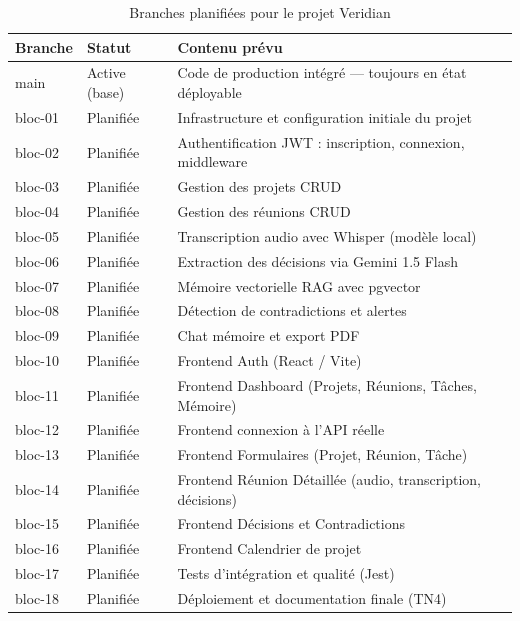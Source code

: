 \documentclass[12pt, a4paper]{article}
\begin{document}
\begin{table}[H]
  \centering
  \caption{Branches planifiées pour le projet Veridian}
  \begin{tabularx}{\textwidth}{>{\ttfamily}l l X}
    \toprule
    \textbf{Branche}  & \textbf{Statut}  & \textbf{Contenu prévu} \\
    \midrule
    main      & Active (base) & Code de production intégré — toujours en état déployable \\
    bloc-01   & Planifiée     & Infrastructure et configuration initiale du projet \\
    bloc-02   & Planifiée     & Authentification JWT : inscription, connexion, middleware \\
    bloc-03   & Planifiée     & Gestion des projets CRUD \\
    bloc-04   & Planifiée     & Gestion des réunions CRUD \\
    bloc-05   & Planifiée     & Transcription audio avec Whisper (modèle local) \\
    bloc-06   & Planifiée     & Extraction des décisions via Gemini 1.5 Flash \\
    bloc-07   & Planifiée     & Mémoire vectorielle RAG avec pgvector \\
    bloc-08   & Planifiée     & Détection de contradictions et alertes \\
    bloc-09   & Planifiée     & Chat mémoire et export PDF \\
    bloc-10   & Planifiée     & Frontend Auth (React / Vite) \\
    bloc-11   & Planifiée     & Frontend Dashboard (Projets, Réunions, Tâches, Mémoire) \\
    bloc-12   & Planifiée     & Frontend connexion à l'API réelle \\
    bloc-13   & Planifiée     & Frontend Formulaires (Projet, Réunion, Tâche) \\
    bloc-14   & Planifiée     & Frontend Réunion Détaillée (audio, transcription, décisions) \\
    bloc-15   & Planifiée     & Frontend Décisions et Contradictions \\
    bloc-16   & Planifiée     & Frontend Calendrier de projet \\
    bloc-17   & Planifiée     & Tests d'intégration et qualité (Jest) \\
    bloc-18   & Planifiée     & Déploiement et documentation finale (TN4) \\
    \bottomrule
  \end{tabularx}
\end{table}
\end{document}
